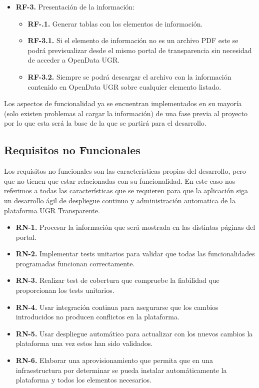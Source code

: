 \begin{itemize}
  \item \textbf{RF-3.} Presentación de la información:
  \begin{itemize}
    \item \textbf{RF-.1.} Generar tablas con los elementos de información.
    \item \textbf{RF-3.1.} Si el elemento de información no es un archivo PDF este se podrá previsualizar desde el mismo portal
    de transparencia sin necesidad de acceder a OpenData UGR.
    \item \textbf{RF-3.2.} Siempre se podrá descargar el archivo con la información contenido en OpenData UGR sobre cualquier 
    elemento listado.
  \end{itemize}
\end{itemize}
	
Los aspectos de funcionalidad ya se encuentran implementados en su mayoría (solo existen problemas al cargar la información) de
una fase previa al proyecto por lo que esta será la base de la que se partirá para el desarrollo.

\subsection{Requisitos no Funcionales}

Los requisitos no funcionales son las características propias del desarrollo, pero que no tienen que estar relacionadas con su 
funcionalidad. En este caso nos referimos a todas las características que se requieren para que la aplicación siga un 
desarrollo ágil de despliegue continuo y administración automatica de la plataforma UGR Transparente.

\begin{itemize}
  \item \textbf{RN-1.} Procesar la información que será mostrada en las distintas páginas del portal.
  \item \textbf{RN-2.} Implementar tests unitarios para validar que todas las funcionalidades programadas funcionan 
  correctamente.
  \item \textbf{RN-3.} Realizar test de cobertura que compruebe la fiabilidad que proporcionan los tests unitarios.
  \item \textbf{RN-4.} Usar integración continua para asegurarse que los cambios introducidos no producen conflictos en la 
  plataforma.
  \item \textbf{RN-5.} Usar despliegue automático para actualizar con los nuevos cambios la plataforma una vez estos han sido 
  validados.
  \item \textbf{RN-6.} Elaborar una aprovisionamiento que permita que en una infraestructura por determinar se pueda instalar 
  automáticamente la plataforma y todos los elementos necesarios.
\end{itemize}

